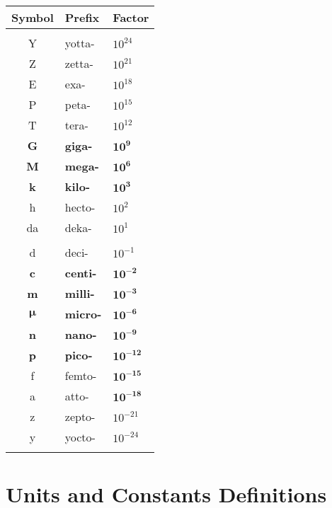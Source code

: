 \documentclass{article}
\begin{document}
\begin{center}
\begin{tabular}{cll}
	\hline
	Symbol & Prefix & Factor \\
	\hline
	\\
	Y & yotta- & $10^{24}$ \\
	Z & zetta- & $10^{21}$ \\
	E & exa- & $10^{18}$ \\
	P & peta- & $10^{15}$ \\
	T & tera- & $10^{12}$ \\
	\textbf{G} & \textbf{giga-} & $\boldsymbol{10^9}$ \\
	\textbf{M} & \textbf{mega-} & $\boldsymbol{10^6}$ \\
	\textbf{k} & \textbf{kilo-} & $\boldsymbol{10^3}$ \\
	h & hecto- & $10^2$ \\
	da & deka- & $10^1$ \\
	\\
	d & deci- & $10^{-1}$ \\
	\textbf{c} & \textbf{centi-} & $\boldsymbol{10^{-2}}$ \\
	\textbf{m} & \textbf{milli-} & $\boldsymbol{10^{-3}}$ \\
	$\boldsymbol{\mu}$ & \textbf{micro-} & $\boldsymbol{10^{-6}}$ \\
	\textbf{n} & \textbf{nano-} & $\boldsymbol{10^{-9}}$ \\		
	\textbf{p} & \textbf{pico-} & $\boldsymbol{10^{-12}}$ \\
	f & femto- & $\boldsymbol{10^{-15}}$ \\
	a & atto- & $\boldsymbol{10^{-18}}$ \\
	z & zepto- & $10^{-21}$ \\
	y & yocto- & $10^{-24}$ \\
	\\
	\hline
\end{tabular}
\end{center}

\cleardoublepage
\section{Units and Constants Definitions}
\end{document}
